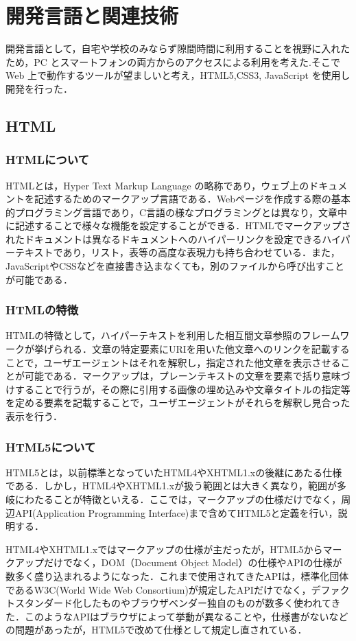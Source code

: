 \documentclass[a4j,12pt]{jarticle}
\begin{document}
\newpage
\section{開発言語と関連技術}
開発言語として，自宅や学校のみならず隙間時間に利用することを視野に入れたため，PC とスマートフォンの両方からのアクセスによる利用を考えた.そこで Web 上で動作するツールが望ましいと考え，HTML5,CSS3, JavaScript を使用し開発を行った．
\subsection{HTML}
\subsubsection{HTMLについて}
HTMLとは，Hyper Text Markup Language の略称であり，ウェブ上のドキュメントを記述するためのマークアップ言語である．Webページを作成する際の基本的プログラミング言語であり，C言語の様なプログラミングとは異なり，文章中に記述することで様々な機能を設定することができる．HTMLでマークアップされたドキュメントは異なるドキュメントへのハイパーリンクを設定できるハイパーテキストであり，リスト，表等の高度な表現力も持ち合わせている．また，JavaScriptやCSSなどを直接書き込まなくても，別のファイルから呼び出すことが可能である\cite{ren8}．
\subsubsection{HTMLの特徴}
HTMLの特徴として，ハイパーテキストを利用した相互間文章参照のフレームワークが挙げられる．文章の特定要素にURIを用いた他文章へのリンクを記載することで，ユーザエージェントはそれを解釈し，指定された他文章を表示させることが可能である．マークアップは，プレーンテキストの文章を要素で括り意味づけすることで行うが，その際に引用する画像の埋め込みや文章タイトルの指定等を定める要素を記載することで，ユーザエージェントがそれらを解釈し見合った表示を行う\cite{ren8}．
\subsubsection{HTML5について}
HTML5とは，以前標準となっていたHTML4やXHTML1.xの後継にあたる仕様である．しかし，HTML4やXHTML1.xが扱う範囲とは大きく異なり，範囲が多岐にわたることが特徴といえる．ここでは，マークアップの仕様だけでなく，周辺API(Application Programming Interface)まで含めてHTML5と定義を行い，説明する．

HTML4やXHTML1.xではマークアップの仕様が主だったが，HTML5からマークアップだけでなく，DOM（Document Object Model）の仕様やAPIの仕様が数多く盛り込まれるようになった．これまで使用されてきたAPIは，標準化団体であるW3C(World Wide Web Consortium)が規定したAPIだけでなく，デファクトスタンダード化したものやブラウザベンダー独自のものが数多く使われてきた．このようなAPIはブラウザによって挙動が異なることや，仕様書がないなどの問題があったが，HTML5で改めて仕様として規定し直されている．
\end{document}
